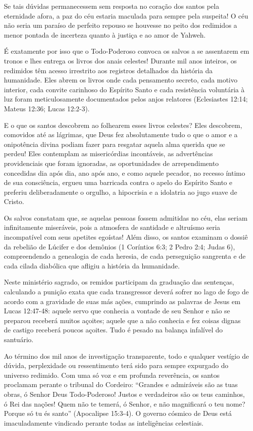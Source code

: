 Se tais dúvidas permanecessem sem resposta no coração dos santos pela eternidade afora, a paz do céu estaria maculada para sempre pela suspeita! O céu não seria um paraíso de perfeito repouso se houvesse no peito dos redimidos a menor pontada de incerteza quanto à justiça e ao amor de Yahweh.

É exatamente por isso que o Todo-Poderoso convoca os salvos a se assentarem em tronos e lhes entrega os livros dos anais celestes! Durante mil anos inteiros, os redimidos têm acesso irrestrito aos registros detalhados da história da humanidade. Eles abrem os livros onde cada pensamento secreto, cada motivo interior, cada convite carinhoso do Espírito Santo e cada resistência voluntária à luz foram meticulosamente documentados pelos anjos relatores (Eclesiastes 12:14; Mateus 12:36; Lucas 12:2-3).

E o que os santos descobrem ao folhearem esses livros celestes?
Eles descobrem, comovidos até as lágrimas, que Deus fez absolutamente tudo o que o amor e a onipotência divina podiam fazer para resgatar aquela alma querida que se perdeu! Eles contemplam as misericórdias incontáveis, as advertências providenciais que foram ignoradas, as oportunidades de arrependimento concedidas dia após dia, ano após ano, e como aquele pecador, no recesso íntimo de sua consciência, ergueu uma barricada contra o apelo do Espírito Santo e preferiu deliberadamente o orgulho, a hipocrisia e a idolatria ao jugo suave de Cristo.

Os salvos constatam que, se aquelas pessoas fossem admitidas no céu, elas seriam infinitamente miseráveis, pois a atmosfera de santidade e altruísmo seria incompatível com seus apetites egoístas!
Além disso, os santos examinam o dossiê da rebelião de Lúcifer e dos demônios (1 Coríntios 6:3; 2 Pedro 2:4; Judas 6), compreendendo a genealogia de cada heresia, de cada perseguição sangrenta e de cada cilada diabólica que afligiu a história da humanidade.

Neste ministério sagrado, os remidos participam da graduação das sentenças, calculando a punição exata que cada transgressor deverá sofrer no lago de fogo de acordo com a gravidade de suas más ações, cumprindo as palavras de Jesus em Lucas 12:47-48: aquele servo que conhecia a vontade de seu Senhor e não se preparou receberá muitos açoites; aquele que a não conhecia e fez coisas dignas de castigo receberá poucos açoites. Tudo é pesado na balança infalível do santuário.

Ao término dos mil anos de investigação transparente, todo e qualquer vestígio de dúvida, perplexidade ou ressentimento terá sido para sempre expurgado do universo redimido. Com uma só voz e em profunda reverência, os santos proclamam perante o tribunal do Cordeiro: ``Grandes e admiráveis são as tuas obras, ó Senhor Deus Todo-Poderoso! Justos e verdadeiros são os teus caminhos, ó Rei das nações! Quem não te temerá, ó Senhor, e não magnificará o teu nome? Porque só tu és santo'' (Apocalipse 15:3-4). O governo cósmico de Deus está imaculadamente vindicado perante todas as inteligências celestiais.



